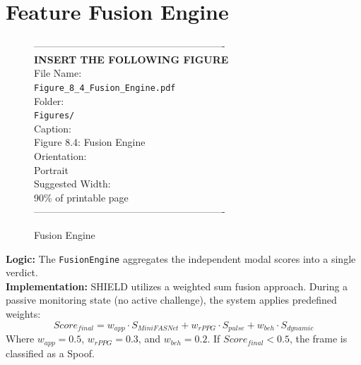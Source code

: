 \section{Feature Fusion Engine}
\vspace{1em}
\begin{figure}[htbp]
\begin{center}
----------------------------------------------------------\\
\vspace{0.5em}
\textbf{INSERT THE FOLLOWING FIGURE}\\
\vspace{1em}
File Name:\\
\texttt{Figure\_8\_4\_Fusion\_Engine.pdf}\\
\vspace{1em}
Folder:\\
\texttt{Figures/}\\
\vspace{1em}
Caption:\\
Figure 8.4: Fusion Engine\\
\vspace{1em}
Orientation:\\
Portrait\\
\vspace{1em}
Suggested Width:\\
90\% of printable page\\
\vspace{3cm}
----------------------------------------------------------
\end{center}
\caption{Fusion Engine}
\label{fig:diag_6}
\end{figure}
\vspace{1em}
\textbf{Logic:} The \texttt{FusionEngine} aggregates the independent modal scores into a single verdict. \\
\textbf{Implementation:} SHIELD utilizes a weighted sum fusion approach. During a passive monitoring state (no active challenge), the system applies predefined weights:
\begin{equation}
Score_{final} = w_{app} \cdot S_{MiniFASNet} + w_{rPPG} \cdot S_{pulse} + w_{beh} \cdot S_{dynamic}
\end{equation}
Where $w_{app} = 0.5$, $w_{rPPG} = 0.3$, and $w_{beh} = 0.2$. If $Score_{final} < 0.5$, the frame is classified as a Spoof.

